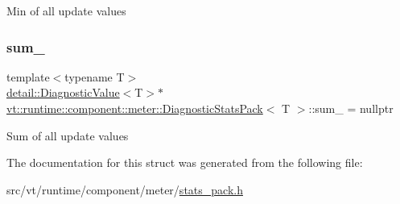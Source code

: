 Min of all update values \mbox{\label{structvt_1_1runtime_1_1component_1_1meter_1_1_diagnostic_stats_pack_a28c6bb74f1f0ab30e2211c3398942eea}} 
\subsubsection{\texorpdfstring{sum\+\_\+}{sum\_}}
{\footnotesize\ttfamily template$<$typename T$>$ \\
\hyperlink{structvt_1_1runtime_1_1component_1_1detail_1_1_diagnostic_value}{detail\+::\+Diagnostic\+Value}$<$T$>$$\ast$ \hyperlink{structvt_1_1runtime_1_1component_1_1meter_1_1_diagnostic_stats_pack}{vt\+::runtime\+::component\+::meter\+::\+Diagnostic\+Stats\+Pack}$<$ T $>$\+::sum\+\_\+ = nullptr\hspace{0.3cm}{\ttfamily [protected]}}

Sum of all update values 

The documentation for this struct was generated from the following file\+:\begin{DoxyCompactItemize}
\item 
src/vt/runtime/component/meter/\hyperlink{stats__pack_8h}{stats\+\_\+pack.\+h}\end{DoxyCompactItemize}
